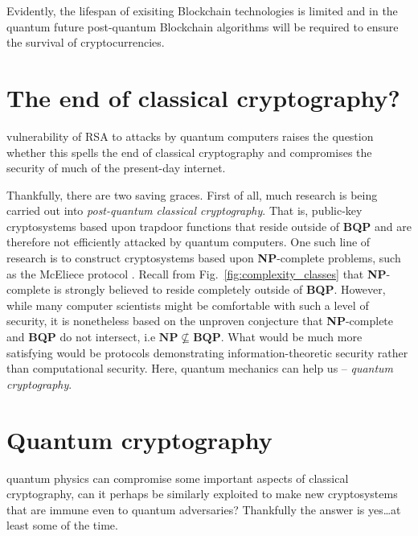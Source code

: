 Evidently, the lifespan of exisiting Blockchain technologies is limited and in the quantum future post-quantum Blockchain algorithms will be required to ensure the survival of cryptocurrencies.

%
%

\section{The end of classical cryptography?} \label{sec:end_of_class_crypto}

 vulnerability of RSA to attacks by quantum computers raises the question whether this spells the end of classical cryptography and compromises the security of much of the present-day internet.

Thankfully, there are two saving graces. First of all, much research is being carried out into \textit{post-quantum classical cryptography}. That is, public-key cryptosystems based upon trapdoor functions that reside outside of \textbf{BQP} and are therefore not efficiently attacked by quantum computers. One such line of research is to construct cryptosystems based upon \textbf{NP}-complete problems, such as the McEliece protocol \cite{bib:McEliece}. Recall from Fig.~\ref{fig:complexity_classes} that \textbf{NP}-complete is strongly believed to reside completely outside of \textbf{BQP}. However, while many computer scientists might be comfortable with such a level of security, it is nonetheless based on the unproven conjecture that \textbf{NP}-complete and \textbf{BQP} do not intersect, i.e \mbox{$\mathbf{NP}\nsubseteq\mathbf{BQP}$}. What would be much more satisfying would be protocols demonstrating information-theoretic security rather than computational security. Here, quantum mechanics can help us -- \textit{quantum cryptography}.

%
%

\section{Quantum cryptography}

 quantum physics can compromise some important aspects of classical cryptography, can it perhaps be similarly exploited to make new cryptosystems that are immune even to quantum adversaries? Thankfully the answer is yes\ldots at least some of the time.

